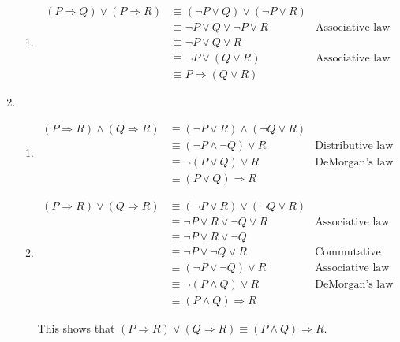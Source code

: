 \documentclass{article}
\begin{document}
\begin{enumerate}
\begin{enumerate}
  \item
    \begin{equation*}
      \begin{aligned}
        (P \Rightarrow Q) \lor (P \Rightarrow R) &\equiv (\lnot P \lor Q) \lor (\lnot P \lor R) \\
        &\equiv \lnot P \lor Q \lor \lnot P \lor R & \text{Associative law} \\
        &\equiv \lnot P \lor Q \lor R \\
        &\equiv \lnot P \lor (Q \lor R) & \text{Associative law} \\
        &\equiv P \Rightarrow (Q \lor R)
      \end{aligned}
    \end{equation*}
  \end{enumerate}
\item
  \begin{enumerate}
  \item
    \begin{equation*}
      \begin{aligned}
        (P \Rightarrow R) \land (Q \Rightarrow R) &\equiv (\lnot P \lor R) \land (\lnot Q \lor R) \\
        &\equiv (\lnot P \land \lnot Q) \lor R & \text{Distributive law} \\
        &\equiv \lnot (P \lor Q) \lor R & \text{DeMorgan's law} \\
        &\equiv (P \lor Q) \Rightarrow R
      \end{aligned}
    \end{equation*}
  \item
     \begin{equation*}
       \begin{aligned}
         (P \Rightarrow R) \lor (Q \Rightarrow R) &\equiv (\lnot P \lor R) \lor (\lnot Q \lor R) \\
         &\equiv \lnot P \lor R \lor \lnot Q \lor R & \text{Associative law} \\
         &\equiv \lnot P \lor R \lor \lnot Q \\
         &\equiv \lnot P \lor \lnot Q \lor R & \text{Commutative law} \\
         &\equiv (\lnot P \lor \lnot Q) \lor R & \text{Associative law} \\
         &\equiv \lnot (P \land Q) \lor R & \text{DeMorgan's law} \\
         &\equiv (P \land Q) \Rightarrow R
       \end{aligned}
    \end{equation*}

     This shows that $(P \Rightarrow R) \lor (Q \Rightarrow R) \equiv (P \land Q) \Rightarrow R$.
  \end{enumerate}
\end{enumerate}
\end{document}
